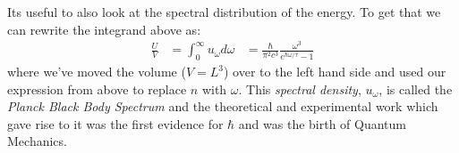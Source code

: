 Its useful to also look at the spectral distribution of the energy. To get that
we can rewrite the integrand above as:
\begin{align}
\frac{U}{V} &= \int_{0}^{\infty} u_{\omega} d\omega
	        &= \frac{\hbar}{\pi^2 c^3} \frac{\omega^3}{e^{\hbar \omega/\tau} - 1}
\end{align}
where we've moved the volume ($V = L^3$) over to the left hand side and used
our expression from above to replace $n$ with $\omega$. This
\textit{spectral density}, $u_{\omega}$, is called the
\emph{Planck Black Body Spectrum} and the theoretical and experimental work which
gave rise to it was the first evidence for $\hbar$ and was the birth of
Quantum Mechanics.
